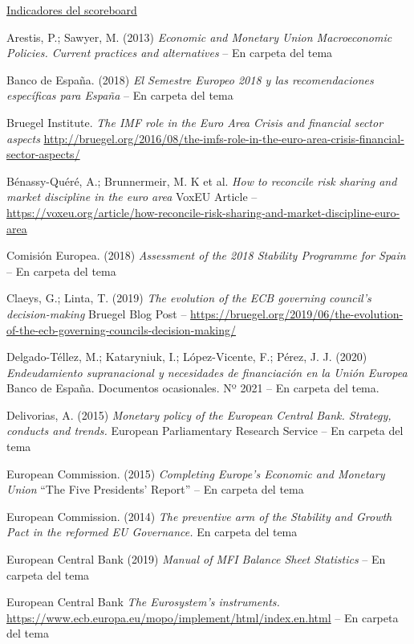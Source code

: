 \documentclass{nuevotema}
\begin{document}
\href{http://ec.europa.eu/eurostat/web/macroeconomic-imbalances-procedure/indicators/main-tables}{Indicadores del scoreboard}

Arestis, P.; Sawyer, M. (2013) \textit{Economic and Monetary Union Macroeconomic Policies. Current practices and alternatives}  -- En carpeta del tema

Banco de España. (2018) \textit{El Semestre Europeo 2018 y las recomendaciones específicas para España}  -- En carpeta del tema

Bruegel Institute. \textit{The IMF role in the Euro Area Crisis and financial sector aspects} \url{http://bruegel.org/2016/08/the-imfs-role-in-the-euro-area-crisis-financial-sector-aspects/}

Bénassy-Quéré, A.; Brunnermeir, M. K et al. \textit{How to reconcile risk sharing and market discipline in the euro area} VoxEU Article -- \url{https://voxeu.org/article/how-reconcile-risk-sharing-and-market-discipline-euro-area}

Comisión Europea. (2018) \textit{Assessment of the 2018 Stability Programme for Spain}  -- En carpeta del tema

Claeys, G.; Linta, T. (2019) \textit{The evolution of the ECB governing council's decision-making} Bruegel Blog Post -- \url{https://bruegel.org/2019/06/the-evolution-of-the-ecb-governing-councils-decision-making/}

Delgado-Téllez, M.; Kataryniuk, I.; López-Vicente, F.; Pérez, J. J. (2020) \textit{Endeudamiento supranacional y necesidades de financiación en la Unión Europea} Banco de España. Documentos ocasionales. Nº 2021 -- En carpeta del tema.

Delivorias, A. (2015) \textit{Monetary policy of the European Central Bank. Strategy, conducts and trends.}  European Parliamentary Research Service -- En carpeta del tema

European Commission. (2015) \textit{Completing Europe's Economic and Monetary Union}  ``The Five Presidents' Report'' -- En carpeta del tema

European Commission. (2014) \textit{The preventive arm of the Stability and Growth Pact in the reformed EU Governance.}  En carpeta del tema

European Central Bank (2019) \textit{Manual of MFI Balance Sheet Statistics}  -- En carpeta del tema

European Central Bank \textit{The Eurosystem's instruments.} \url{https://www.ecb.europa.eu/mopo/implement/html/index.en.html} -- En carpeta del tema
\end{document}
